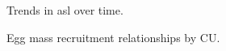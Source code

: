 \documentclass[11pt]{book}
\begin{document}
\begin{figure}[htb]

{\centering {} 

}

\caption{Trends in asl over time.}\label{fig:fig-asl}
\end{figure}

\begin{figure}[htb]

{\centering {} 

}

\caption{Egg mass recruitment relationships by CU.}\label{fig:fig-CU-EMR}
\end{figure}
\end{document}
